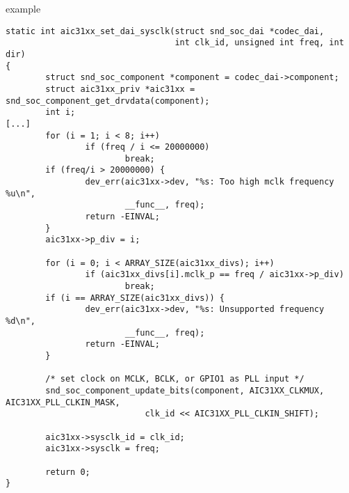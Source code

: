 \begin{frame}[fragile]{ example}
  \begin{block}{}
    \fontsize{6}{6}\selectfont
    \begin{verbatim}
static int aic31xx_set_dai_sysclk(struct snd_soc_dai *codec_dai,
                                  int clk_id, unsigned int freq, int dir)
{
        struct snd_soc_component *component = codec_dai->component;
        struct aic31xx_priv *aic31xx = snd_soc_component_get_drvdata(component);
        int i;
[...]
        for (i = 1; i < 8; i++)
                if (freq / i <= 20000000)
                        break;
        if (freq/i > 20000000) {
                dev_err(aic31xx->dev, "%s: Too high mclk frequency %u\n",
                        __func__, freq);
                return -EINVAL;
        }
        aic31xx->p_div = i;

        for (i = 0; i < ARRAY_SIZE(aic31xx_divs); i++)
                if (aic31xx_divs[i].mclk_p == freq / aic31xx->p_div)
                        break;
        if (i == ARRAY_SIZE(aic31xx_divs)) {
                dev_err(aic31xx->dev, "%s: Unsupported frequency %d\n",
                        __func__, freq);
                return -EINVAL;
        }

        /* set clock on MCLK, BCLK, or GPIO1 as PLL input */
        snd_soc_component_update_bits(component, AIC31XX_CLKMUX, AIC31XX_PLL_CLKIN_MASK,
                            clk_id << AIC31XX_PLL_CLKIN_SHIFT);

        aic31xx->sysclk_id = clk_id;
        aic31xx->sysclk = freq;

        return 0;
}
    \end{verbatim}
  \end{block}
\end{frame}

